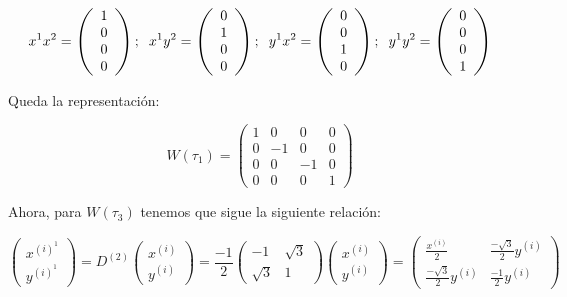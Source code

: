 \documentclass{article}
\begin{document}
\begin{enumerate}
\begin{enumerate}
$$x^1x^2=\left( \begin{array}{c}
 1  \\
 0 \\
 0 \\
 0
\end{array} \right ); \hspace{0.2cm} x^1y^2=\left( \begin{array}{c}
 0  \\
 1 \\
 0 \\
 0
\end{array} \right ); \hspace{0.2cm} y^1x^2=\left( \begin{array}{c}
 0  \\
 0 \\
 1 \\
 0
\end{array} \right ); \hspace{0.2cm} y^1y^2=\left( \begin{array}{c}
 0  \\
 0 \\
 0 \\
 1
\end{array} \right )$$

Queda la representación:

$$W(\tau _1)=\left (\begin{array}{cccc}
1  & 0 & 0 & 0 \\
0  & -1 & 0 & 0 \\
 0 & 0 & -1 & 0 \\
 0 & 0 & 0 & 1
\end{array} \right)$$

Ahora, para $W(\tau _3)$ tenemos que sigue la siguiente relación:

$$\left ( \begin{array}{c}
 x^{(i)^1}  \\
   y^{(i)^1}
\end{array}\right) = D^{(2)} \left ( \begin{array}{c}
 x^{(i)}  \\
   y^{(i)}
\end{array}\right)=\frac{-1}{2}\left ( \begin{array}{cc}
-1 & \sqrt{3} \\
   \sqrt{3} & 1
\end{array}\right)\left ( \begin{array}{c}
 x^{(i)}  \\
   y^{(i)}
\end{array}\right)= \left ( \begin{array}{cc}
 \frac{x^{(i)}}{2} & \frac{-\sqrt{3}}{2}y^{(i)}  \\
 \frac{-\sqrt{3}}{2}y^{(i)}  & \frac{-1}{2}y^{(i)}
\end{array}\right)$$


\end{enumerate}
\end{enumerate}
\end{document}
